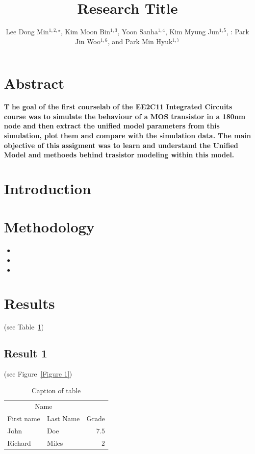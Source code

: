\documentclass[	DIV=calc,%
							paper=a4,%
							fontsize=12pt,%
							twocolumn]{scrartcl}	 					%
\title{Research Title}					%
\author{Lee Dong Min$^{1, 2,\star}$, Kim Moon Bin$^{1,3}$, Yoon Sanha$^{1,4}$, \newline Kim Myung Jun$^{1,5}$, : Park Jin Woo$^{1,6}$, and Park Min Hyuk$^{1,7}$ }											%
\date{}																%
\newcommand{\initial}[1]{%
     \lettrine[lines=3,lhang=0.3,nindent=0em]{
     				\color{DarkBlue}
     				{\textsf{#1}}}{}}
\begin{document}
\maketitle
\thispagestyle{fancy} 			%
\section*{Abstract}
\initial{\textbf{T}}\textbf{
	he goal of the first courselab of the EE2C11 Integrated Circuits course was to simulate the behaviour of a MOS transistor in a 180nm node and then extract the unified model parameters from this simulation, plot them and compare with the simulation data. The main objective of this assigment was to learn and understand the Unified Model and methoeds behind trasistor modeling within this model. }

\section*{Introduction}
\; \; %



\section*{Methodology}
\; \; %
\lipsum[6]
\begin{itemize}
	\item \lipsum[7] 
	\item \lipsum[7] 
	\item \lipsum[7] 
\end{itemize}

\lipsum[6]

\section*{Results}
\; \; %
\lipsum[7] (see Table~\ref{Tab1}) 

\subsection*{Result 1}
\; \; %
\lipsum[7] (see Figure~\ref{Figure 1})

\begin{table}
\caption{Caption of table}
\centering
	\begin{tabular}{llr}
		\toprule
		\multicolumn{2}{c}{Name} \\
		\cmidrule(r){1-2}
			First name & Last Name & Grade \\
		\midrule
			John & Doe & $7.5$ \\
			Richard & Miles & $2$ \\
		\bottomrule
	\end{tabular}
 \label{Tab1}
\end{table}
\end{document}

